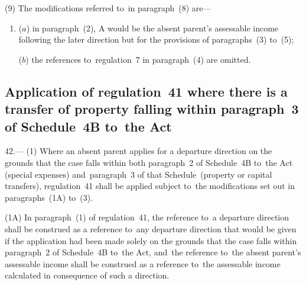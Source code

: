 \documentclass[12pt,a4paper]{article}
\begin{document}
(9) The modifications referred to~in paragraph~(8) are—
\begin{enumerate}\item[]
($a$) in paragraph~(2), A would be the absent parent’s assessable income following
the later direction but for the provisions of paragraphs~(3) to~(5);

($b$) the references to~regulation~7 in paragraph~(4) are omitted.
\end{enumerate}


\subsection[42. Application of regulation~41 where there is a transfer of property falling
within paragraph~3 of Schedule~4B to~the Act]{Application of regulation~41 where there is a transfer of property falling
within paragraph~3 of Schedule~4B to~the Act}

42.—%
%
(1) Where an absent parent applies for a departure direction on the grounds that the case falls within both paragraph~2 of Schedule~4B to~the Act (special expenses) and~paragraph~3 of that Schedule~(property or capital transfers), regulation~41 shall be applied subject to~the modifications set out in paragraphs~(1A) to~(3).

(1A) In paragraph~(1) of regulation~41, the reference to~a departure direction shall be construed as a reference to~any departure direction that would be given if the application had been made solely on the grounds that the case falls within paragraph~2 of Schedule~4B to~the Act, and~the reference to~the absent parent’s assessable income shall be construed as a reference to~the assessable income calculated in consequence of such a direction.
\end{document}
